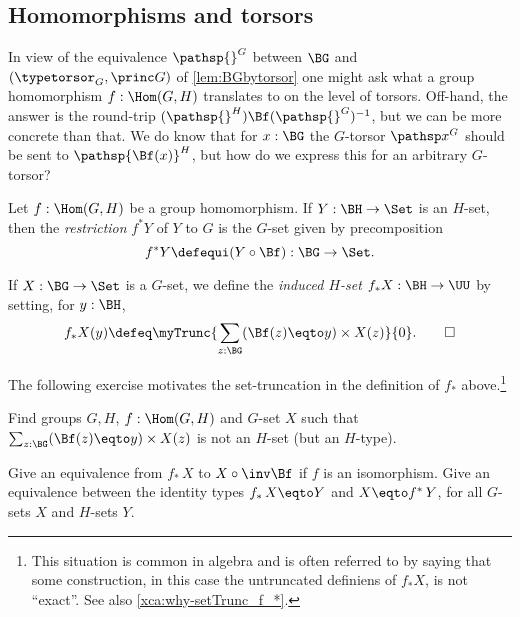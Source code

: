 \subsection{Homomorphisms and torsors}
\label{sec:homotor}
In view of the equivalence $\pathsp{}^G$ between $\BG$ and 
$(\typetorsor_G,\princ G)$ of \cref{lem:BGbytorsor} one might 
ask what a group homomorphism  $f:\Hom(G,H)$ translates to on 
the level of torsors.  Off-hand, the answer is the round-trip 
$(\pathsp{}^H)\Bf(\pathsp{}^G)^{-1}$, but we can be more concrete than that.
We do know that for $x:\BG$ the $G$-torsor $\pathsp x^G$ should be sent to
$\pathsp {\Bf(x)}^H$, but how do we express this for an arbitrary $G$-torsor?
\begin{definition}
  \label{def:restrictandinduce}
  Let $f:\Hom(G,H)$ be a group homomorphism.  If $Y:\BH\to\Set$ is an $H$-set,
  then the \emph{restriction}
  $f^*Y$ of $Y$ to $G$ is the $G$-set given by precomposition
  \[
    f^*Y\defequi (Y\circ\Bf) :\BG\to\Set.
  \]

  If $X:\BG\to\Set$ is a $G$-set, we define
  the \emph{induced $H$-set}
  $f_*X : \BH\to\UU$ by setting, for $y:\BH$,
  \[
    f_*X(y)\defeq\myTrunc{\sum_{z:\BG}(\Bf(z) \eqto y)\times X(z)}{0}.\qedhere
  \]
\end{definition}
The following exercise motivates the set-truncation in the definition
of $f_*$ above.\footnote{%
    This situation is common in algebra and is often referred to by saying
    that some construction, in this case the untruncated
    definiens of $f_*X$, is not ``exact''. See also \cref{xca:why-setTrunc_f_*}.}

\begin{xca}\label{xca:why-setTrunc_f_*}
Find groups $G,H$, $f:\Hom(G,H)$ and $G$-set $X$ such that
$\sum_{z:\BG}(\Bf(z) \eqto y)\times X(z)$ is not an $H$-set (but an $H$-type).
\end{xca}

\begin{xca}\label{xca:id_*-is-id}
 Give an equivalence from $f_*\,X$ to $X\circ\inv\Bf$
    if $f$ is an isomorphism. Give an equivalence between the identity
    types $f_*\,X \eqto Y$ and $X \eqto f^*\,Y$, for all $G$-sets $X$
    and $H$-sets $Y$.
\end{xca}


